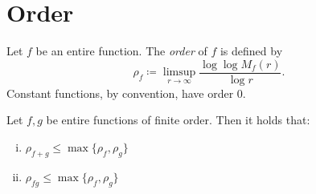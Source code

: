 \chapter{Order}
\label{ch:order}

\begin{definition} \label{def:order}
    Let $f$ be an entire function. The \emph{order} of $f$ is defined by
    \begin{equation} \label{eq:def-order}
        \rho_f \coloneqq \limsup_{r \to \infty} \frac{\log \log M_f(r)}{\log r}.
    \end{equation}
    Constant functions, by convention, have order 0.
\end{definition}

\begin{remark} \label{rem:order}
\end{remark}

\begin{proposition} \label{prop:algebraic-properties-order}
    Let $f, g$ be entire functions of finite order. Then it holds that:
    \begin{enumerate}[i.]
        \item $\rho_{f + g} \leq \max \{ \rho_f, \rho_g \}$
        \item $\rho_{f g} \leq \max \{ \rho_f, \rho_g \}$
    \end{enumerate}
\end{proposition}

